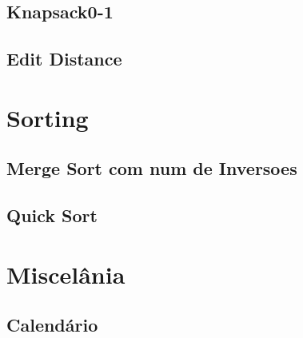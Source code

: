 \subsection{Knapsack0-1}
\raggedbottom
\hrulefill
\subsection{Edit Distance}
\raggedbottom
\hrulefill

\section{Sorting}
\subsection{Merge Sort com num de Inversoes}
\raggedbottom
\hrulefill
\subsection{Quick Sort}
\raggedbottom
\hrulefill

\section{Miscelânia}
\subsection{Calendário}
\raggedbottom
\hrulefill

